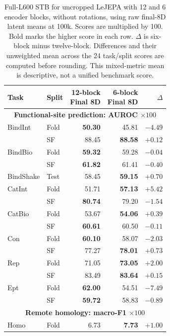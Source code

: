 \begin{table}[htbp]
\centering
\setlength{\tabcolsep}{6pt}
\renewcommand{\arraystretch}{0.97}
\captionsetup{font=small,skip=5pt}
\fontsize{8.8}{10}\selectfont
\caption{Full-L600 STB for uncropped LeJEPA with 12 and 6 encoder blocks, without rotations, using raw final-8D latent means at 100k. Scores are multiplied by 100. Bold marks the higher score in each row. $\Delta$ is six-block minus twelve-block. Differences and their unweighted mean across the 24 task/split scores are computed before rounding. This mixed-metric mean is descriptive, not a unified benchmark score.}
\label{tab:results-encoder-depth}
\begin{tabular}{@{}llrrr@{}}
\toprule
Task & Split & \shortstack{12-block\\Final 8D} & \shortstack{6-block\\Final 8D} & $\Delta$ \\
\midrule
\multicolumn{5}{c}{\textbf{Functional-site prediction: AUROC $\times100$}} \\
\midrule
BindInt & Fold & \textbf{50.30} & 45.81 & $-4.49$ \\
 & SF & 88.45 & \textbf{88.58} & $+0.12$ \\
BindBio & Fold & \textbf{59.32} & 59.28 & $-0.04$ \\
 & SF & \textbf{61.82} & 61.41 & $-0.40$ \\
BindShake & Test & 58.45 & \textbf{59.15} & $+0.70$ \\
CatInt & Fold & 51.71 & \textbf{57.13} & $+5.42$ \\
 & SF & \textbf{80.74} & 79.20 & $-1.54$ \\
CatBio & Fold & 53.67 & \textbf{54.06} & $+0.39$ \\
 & SF & \textbf{60.61} & 60.50 & $-0.11$ \\
Con & Fold & \textbf{60.10} & 58.07 & $-2.03$ \\
 & SF & 77.27 & \textbf{78.01} & $+0.73$ \\
Rep & Fold & 71.05 & \textbf{73.05} & $+2.00$ \\
 & SF & 83.49 & \textbf{83.64} & $+0.15$ \\
Ept & Fold & \textbf{62.00} & 54.51 & $-7.49$ \\
 & SF & \textbf{59.72} & 58.83 & $-0.89$ \\
\midrule
\multicolumn{5}{c}{\textbf{Remote homology: macro-F1 $\times100$}} \\
\midrule
Homo & Fold & 6.73 & \textbf{7.73} & $+1.00$ \\

\end{tabular}
\end{table}
